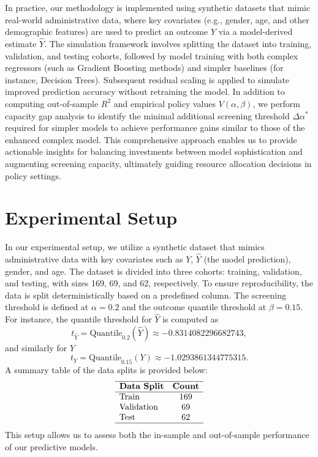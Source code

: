 \documentclass{article}
\begin{document}
In practice, our methodology is implemented using synthetic datasets that mimic real-world administrative data, where key covariates (e.g., gender, age, and other demographic features) are used to predict an outcome \(Y\) via a model-derived estimate \(\hat{Y}\). The simulation framework involves splitting the dataset into training, validation, and testing cohorts, followed by model training with both complex regressors (such as Gradient Boosting methods) and simpler baselines (for instance, Decision Trees). Subsequent residual scaling is applied to simulate improved prediction accuracy without retraining the model. In addition to computing out-of-sample \(R^2\) and empirical policy values \(V(\alpha,\beta)\), we perform capacity gap analysis to identify the minimal additional screening threshold \(\Delta \alpha^*\) required for simpler models to achieve performance gains similar to those of the enhanced complex model. This comprehensive approach enables us to provide actionable insights for balancing investments between model sophistication and augmenting screening capacity, ultimately guiding resource allocation decisions in policy settings.

\section{Experimental Setup}
In our experimental setup, we utilize a synthetic dataset that mimics administrative data with key covariates such as \(Y\), \(\hat{Y}\) (the model prediction), gender, and age. The dataset is divided into three cohorts: training, validation, and testing, with sizes 169, 69, and 62, respectively. To ensure reproducibility, the data is split deterministically based on a predefined column. The screening threshold is defined at \(\alpha = 0.2\) and the outcome quantile threshold at \(\beta = 0.15\). For instance, the quantile threshold for \(\hat{Y}\) is computed as 
\[
t_{\hat{Y}} = \text{Quantile}_{0.2}(\hat{Y}) \approx -0.8314082296682743,
\]
and similarly for \(Y\)
\[
t_Y = \text{Quantile}_{0.15}(Y) \approx -1.0293861344775315.
\]
A summary table of the data splits is provided below:
\[
\begin{array}{lc}
\hline
\textbf{Data Split} & \textbf{Count} \\
\hline
\text{Train} & 169 \\
\text{Validation} & 69 \\
\text{Test} & 62 \\
\hline
\end{array}
\]
This setup allows us to assess both the in-sample and out-of-sample performance of our predictive models.
\end{document}
